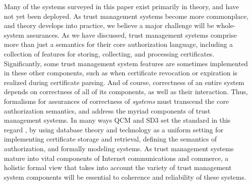 Many of the systems surveyed in this paper exist primarily in theory,
and have not yet been deployed.  As trust management systems become
more commonplace, and theory develops into practice, we believe a
major challenge will be whole-system assurances.  As we have
discussed, trust management systems comprise more than just a
semantics for their core authorization language, including a
collection of features for storing, collecting, and processing
certificates.  Significantly, some trust management system features
are sometimes implemented in these other components, such as when
certificate revocation or expiration is realized during certificate
parsing.  And of course, correctness of an entire system depends on
correctness of all of its components, as well as their interaction.
Thus, formalisms for assurances of correctness of \emph{systems} must
transcend the core authorization semantics, and address the myriad
components of trust management systems.  In many ways QCM and SD3 set
the standard in this regard \cite{Gunter:DALSI,Jim:STMSCE}, by using
database theory and technology as a uniform setting for implementing
certificate storage and retrieval, defining the semantics of
authorization, and formally modeling systems.  As trust management
systems mature into vital components of Internet communications and
commerce, a holistic formal view that takes into account the variety
of trust management system components will be essential to coherence
and reliability of these systems.
 

